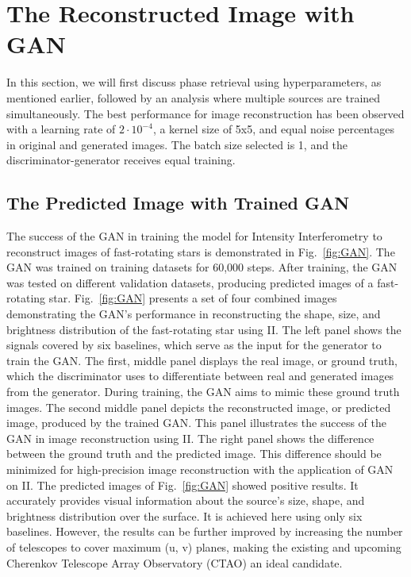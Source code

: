 \section{The Reconstructed Image with GAN}
In this section, we will first discuss phase retrieval using hyperparameters, as mentioned earlier, followed by an analysis where multiple sources are trained simultaneously. The best performance for image reconstruction has been observed with a learning rate of $2 \cdot 10^{-4}$, a kernel size of 5x5, and equal noise percentages in original and generated images. The batch size selected is 1, and the discriminator-generator receives equal training.
\subsection{The Predicted Image with Trained GAN}
The success of the GAN in training the model for Intensity Interferometry to reconstruct images of fast-rotating stars is demonstrated in Fig.~\ref{fig:GAN}. The GAN was trained on training datasets for 60,000 steps. After training, the GAN was tested on different validation datasets, producing predicted images of a fast-rotating star. Fig.~\ref{fig:GAN} presents a set of four combined images demonstrating the GAN's performance in reconstructing the shape, size, and brightness distribution of the fast-rotating star using II. The left panel shows the signals covered by six baselines, which serve as the input for the generator to train the GAN. The first, middle panel displays the real image, or ground truth, which the discriminator uses to differentiate between real and generated images from the generator. During training, the GAN aims to mimic these ground truth images. The second middle panel depicts the reconstructed image, or predicted image, produced by the trained GAN. This panel illustrates the success of the GAN in image reconstruction using II. The right panel shows the difference between the ground truth and the predicted image. This difference should be minimized for high-precision image reconstruction with the application of GAN on II. The predicted images of Fig.~\ref{fig:GAN} showed positive results. It accurately provides visual information about the source's size, shape, and brightness distribution over the surface. It is achieved here using only six baselines. However, the results can be further improved by increasing the number of telescopes to cover maximum (u, v) planes, making the existing and upcoming Cherenkov Telescope Array Observatory (CTAO) an ideal candidate. 
